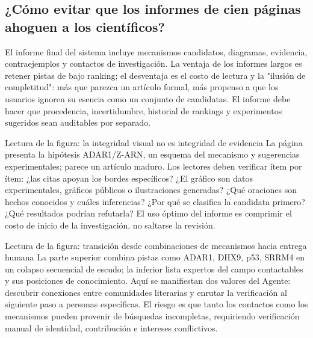 \subsection{¿Cómo evitar que los informes de cien páginas ahoguen a los científicos?}

El informe final del sistema incluye mecanismos candidatos, diagramas, evidencia, contraejemplos y contactos de investigación. La ventaja de los informes largos es retener pistas de bajo ranking; el desventaja es el costo de lectura y la "ilusión de completitud": más que parezca un artículo formal, más propenso a que los usuarios ignoren su esencia como un conjunto de candidatas. El informe debe hacer que procedencia, incertidumbre, historial de rankings y experimentos sugeridos sean auditables por separado.


\begin{knowledgebox}{Lectura de la figura: la integridad visual no es integridad de evidencia}
La página presenta la hipótesis ADAR1/Z-ARN, un esquema del mecanismo y sugerencias experimentales; parece un artículo maduro. Los lectores deben verificar ítem por ítem: ¿las citas apoyan los bordes específicos? ¿El gráfico son datos experimentales, gráficos públicos o ilustraciones generadas? ¿Qué oraciones son hechos conocidos y cuáles inferencias? ¿Por qué se clasifica la candidata primero? ¿Qué resultados podrían refutarla? El uso óptimo del informe es comprimir el costo de inicio de la investigación, no saltarse la revisión.
\end{knowledgebox}


\begin{knowledgebox}{Lectura de la figura: transición desde combinaciones de mecanismos hacia entrega humana}
La parte superior combina pistas como ADAR1, DHX9, p53, SRRM4 en un colapso secuencial de escudo; la inferior lista expertos del campo contactables y sus posiciones de conocimiento. Aquí se manifiestan dos valores del Agente: descubrir conexiones entre comunidades literarias y enrutar la verificación al siguiente paso a personas específicas. El riesgo es que tanto los contactos como los mecanismos pueden provenir de búsquedas incompletas, requiriendo verificación manual de identidad, contribución e intereses conflictivos.
\end{knowledgebox}

